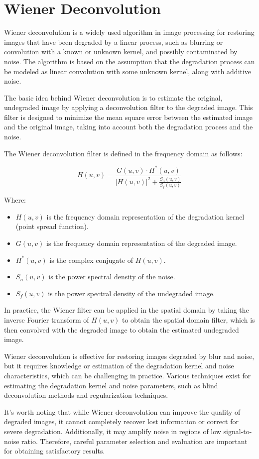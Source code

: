 \documentclass{article}
\begin{document}
\section*{Wiener Deconvolution}

Wiener deconvolution is a widely used algorithm in image processing for restoring images that have been degraded by a linear process, such as blurring or convolution with a known or unknown kernel, and possibly contaminated by noise. The algorithm is based on the assumption that the degradation process can be modeled as linear convolution with some unknown kernel, along with additive noise.

The basic idea behind Wiener deconvolution is to estimate the original, undegraded image by applying a deconvolution filter to the degraded image. This filter is designed to minimize the mean square error between the estimated image and the original image, taking into account both the degradation process and the noise.

The Wiener deconvolution filter is defined in the frequency domain as follows:

\[
H(u, v) = \frac{{G(u, v) \cdot H^*(u, v)}}{{|H(u, v)|^2 + \frac{{S_n(u, v)}}{{S_f(u, v)}}}}
\]

Where:
\begin{itemize}
    \item \( H(u, v) \) is the frequency domain representation of the degradation kernel (point spread function).
    \item \( G(u, v) \) is the frequency domain representation of the degraded image.
    \item \( H^*(u, v) \) is the complex conjugate of \( H(u, v) \).
    \item \( S_n(u, v) \) is the power spectral density of the noise.
    \item \( S_f(u, v) \) is the power spectral density of the undegraded image.
\end{itemize}

In practice, the Wiener filter can be applied in the spatial domain by taking the inverse Fourier transform of \( H(u, v) \) to obtain the spatial domain filter, which is then convolved with the degraded image to obtain the estimated undegraded image.

Wiener deconvolution is effective for restoring images degraded by blur and noise, but it requires knowledge or estimation of the degradation kernel and noise characteristics, which can be challenging in practice. Various techniques exist for estimating the degradation kernel and noise parameters, such as blind deconvolution methods and regularization techniques.

It's worth noting that while Wiener deconvolution can improve the quality of degraded images, it cannot completely recover lost information or correct for severe degradation. Additionally, it may amplify noise in regions of low signal-to-noise ratio. Therefore, careful parameter selection and evaluation are important for obtaining satisfactory results.
\end{document}
